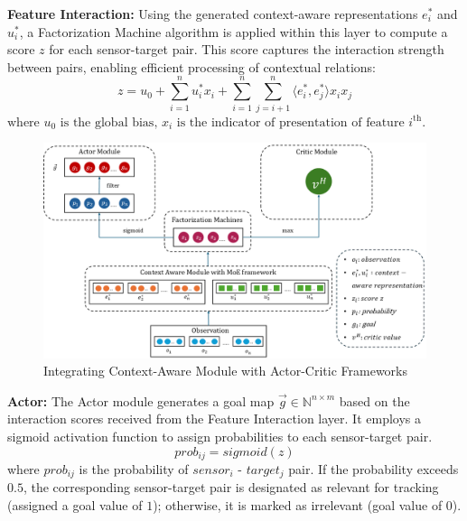 \documentclass[preprint,12pt]{elsarticle}
\begin{document}

\noindent\textbf{Feature Interaction:} Using the generated context-aware representations $e^*_i$ and $u^*_i$, a Factorization Machine algorithm is applied within this layer to compute a score $z$ for each sensor-target pair. This score captures the interaction strength between pairs, enabling efficient processing of contextual relations: 
\begin{equation}
z = u_0 + \sum_{i=1}^{n} u_i^* x_i + \sum_{i=1}^{n} \sum_{j=i+1}^{n} \langle e_i^* , e_j^* \rangle x_i x_j
\end{equation}
$\text{where } u_0 \text{ is the global bias, } x_i \text{ is the indicator of presentation of feature } i^{\text{th}}.$

\begin{figure}[h]
    \centering  \includegraphics[width=\linewidth]{graphics/Integration.png}
    \caption{Integrating Context-Aware Module with Actor-Critic Frameworks}
    \label{fig:integration}
    
\end{figure}
\noindent\textbf{Actor:} The Actor module generates a goal map $\overset{\rightarrow}{g}\in\mathbb{N}^{n\times m} $ based on the interaction scores received from the Feature Interaction layer. It employs a sigmoid activation function to assign probabilities to each sensor-target pair. 
\begin{equation}
    prob_{ij} = sigmoid(z)
\end{equation}
where $prob_{ij}$ is the probability of $sensor_i$ - $target_j$ pair.
If the probability exceeds $0.5$, the corresponding sensor-target pair is designated as relevant for tracking (assigned a goal value of $1$); otherwise, it is marked as irrelevant (goal value of $0$). 
\end{document}
